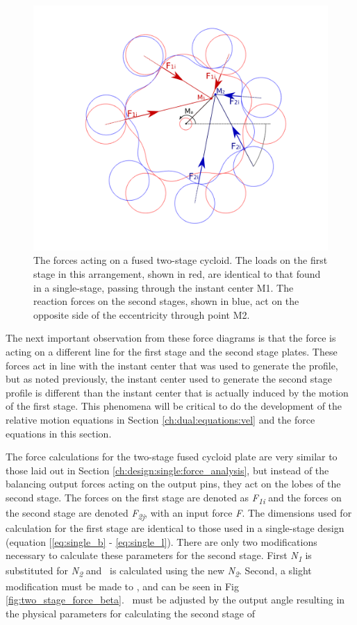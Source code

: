 \begin{figure}[h]
	\centering
	\includegraphics[width=0.80\linewidth]{fig/two_stage_loads_neg}
   \caption{The forces acting on a fused two-stage cycloid. The loads on the first stage in this arrangement, shown in red, are identical to that found in a single-stage, passing through the instant center M1. The reaction forces on the second stages, shown in blue, act on the opposite side of the eccentricity through point M2. }
   \label{fig:two_stage_force_neg}
\end{figure}

The next important observation from these force diagrams is that the force is acting on a different line for the first stage and the second stage plates. These forces act in line with the instant center that was used to generate the profile, but as noted previously, the instant center used to generate the second stage profile is different than the instant center that is actually induced by the motion of the first stage. This phenomena will be critical to do the development of the relative motion equations in Section \ref{ch:dual:equations:vel} and the force equations in this section. 

The force calculations for the two-stage fused cycloid plate are very similar to those laid out in Section \ref{ch:design:single:force_analysis}, but instead of the balancing output forces acting on the output pins, they act on the lobes of the second stage. The forces on the first stage are denoted as \textit{F\textsubscript{1i}} and the forces on the second stage are denoted \textit{F\textsubscript{2j}}, with an input force \textit{F}. The dimensions used for calculation for the first stage are identical to those used in a single-stage design (equation [\ref{eq:single_b} - \ref{eq:single_l}). There are only two modifications necessary to calculate these parameters for the second stage. First \textit{N\textsubscript{1}} is substituted for \textit{N\textsubscript{2}} and \textrho\ is calculated using the new \textit{N\textsubscript{2}}. Second, a slight modification must be made to \textbeta, and can be seen in Fig \ref{fig:two_stage_force_beta}. \textbeta\ must be adjusted by the output angle \textalpha resulting in the physical parameters for calculating the second stage of 


